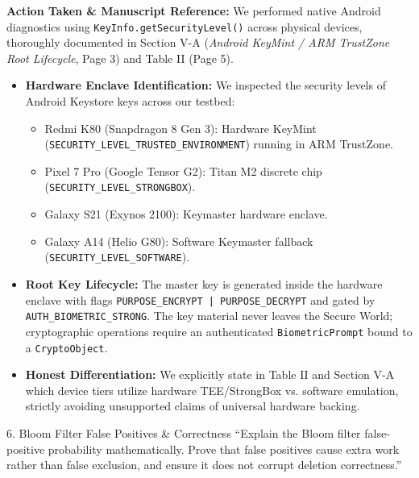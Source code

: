 \documentclass[11pt,a4paper]{article}
\begin{document}
\begin{responsebox}
\textbf{Action Taken \& Manuscript Reference:} We performed native Android diagnostics using \texttt{KeyInfo.getSecurityLevel()} across physical devices, thoroughly documented in Section V-A (\emph{Android KeyMint / ARM TrustZone Root Lifecycle}, Page 3) and Table II (Page 5).

\begin{itemize}[itemsep=2pt]
    \item \textbf{Hardware Enclave Identification:} We inspected the security levels of Android Keystore keys across our testbed:
    \begin{itemize}[itemsep=1pt]
        \item Redmi K80 (Snapdragon 8 Gen 3): Hardware KeyMint (\texttt{SECURITY\_LEVEL\_TRUSTED\_ENVIRONMENT}) running in ARM TrustZone.
        \item Pixel 7 Pro (Google Tensor G2): Titan M2 discrete chip (\texttt{SECURITY\_LEVEL\_STRONGBOX}).
        \item Galaxy S21 (Exynos 2100): Keymaster hardware enclave.
        \item Galaxy A14 (Helio G80): Software Keymaster fallback (\texttt{SECURITY\_LEVEL\_SOFTWARE}).
    \end{itemize}
    \item \textbf{Root Key Lifecycle:} The master key is generated inside the hardware enclave with flags \texttt{PURPOSE\_ENCRYPT | PURPOSE\_DECRYPT} and gated by \texttt{AUTH\_BIOMETRIC\_STRONG}. The key material never leaves the Secure World; cryptographic operations require an authenticated \texttt{BiometricPrompt} bound to a \texttt{CryptoObject}.
    \item \textbf{Honest Differentiation:} We explicitly state in Table II and Section V-A which device tiers utilize hardware TEE/StrongBox vs. software emulation, strictly avoiding unsupported claims of universal hardware backing.
\end{itemize}
\end{responsebox}

\vspace{1em}

\begin{reviewbox}{6. Bloom Filter False Positives \& Correctness}
``Explain the Bloom filter false-positive probability mathematically. Prove that false positives cause extra work rather than false exclusion, and ensure it does not corrupt deletion correctness.''
\end{reviewbox}
\end{document}
